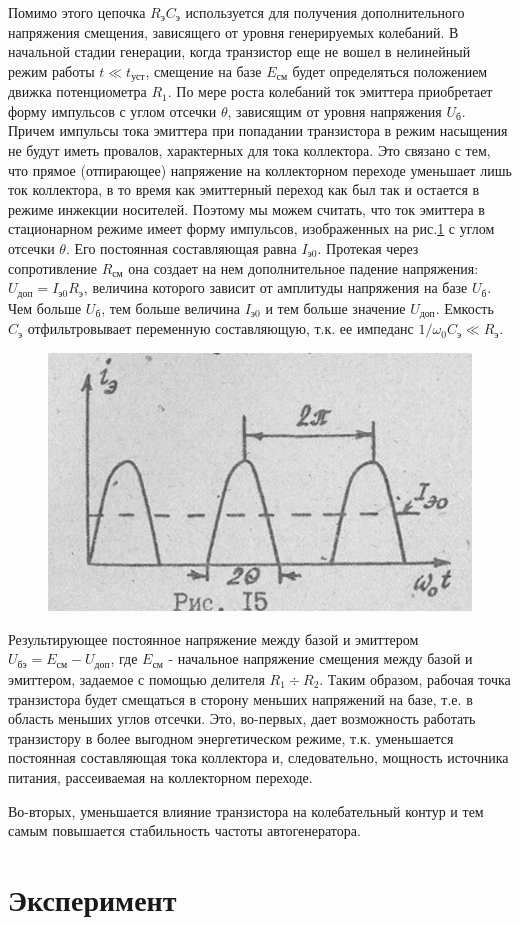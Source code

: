 Помимо этого цепочка $R_\text{э}C_\text{э}$ используется для получения дополнительного напряжения смещения, зависящего от уровня генерируемых колебаний. В начальной стадии генерации, когда транзистор еще не вошел в нелинейный режим работы $t\ll t_\text{уст}$, смещение на базе $E_\text{см}$ будет определяться положением движка потенциометра $R_1$. По мере роста колебаний ток эмиттера приобретает форму импульсов с углом отсечки $\theta$, зависящим от уровня напряжения $U_\text{б}$. Причем импульсы тока эмиттера при попадании транзистора в режим насыщения не будут иметь провалов, характерных для тока коллектора. Это связано с тем, что прямое (отпирающее) напряжение на коллекторном переходе уменьшает лишь ток коллектора, в то время как эмиттерный переход как был так и остается в режиме инжекции носителей. Поэтому мы можем считать, что ток эмиттера в стационарном режиме имеет форму импульсов, изображенных на рис.\ref{fig:figure15} с углом отсечки $\theta$. Его постоянная составляющая равна $I_{\text{э}0}$. Протекая через сопротивление $R_\text{см}$ она создает на нем дополнительное падение напряжения: $U_\text{доп}=I_{\text{э}0}R_\text{э}$, величина которого зависит от амплитуды напряжения на базе $U_\text{б}$. Чем больше $U_\text{б}$, тем больше величина $I_{\text{э}0}$ и тем больше значение $U_\text{доп}$. Емкость $C_\text{э}$ отфильтровывает переменную составляющую, т.к. ее импеданс $1/\omega_0 C_\text{э}\ll R_\text{э}$.

\begin{figure}
\includegraphics[width=\linewidth]{circuit/15.jpg}
\caption{}
\label{fig:figure15}
\vspace{-20pt}
\end{figure}

Результирующее постоянное напряжение между базой и эмиттером $U_\text{бэ}=E_\text{см}-U_\text{доп}$, где $E_\text{см}$ - начальное напряжение смещения между базой и эмиттером, задаемое с помощью делителя $R_1\div R_2$. Таким образом, рабочая точка транзистора будет смещаться в сторону меньших напряжений на базе, т.е. в область меньших углов отсечки. Это, во-первых, дает возможность работать транзистору в более выгодном энергетическом режиме, т.к. уменьшается постоянная составляющая тока коллектора и, следовательно, мощность источника питания, рассеиваемая на коллекторном переходе.

Во-вторых, уменьшается влияние транзистора на колебательный контур и тем самым повышается стабильность частоты автогенератора.
\section{Эксперимент}
